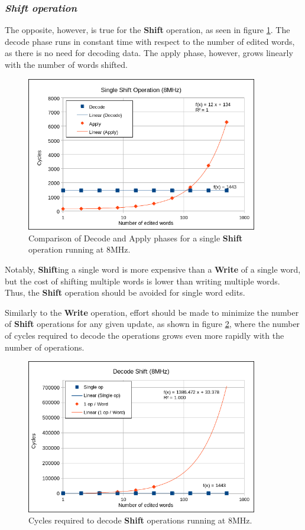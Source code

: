 \subsubsection*{\textbf{\textit{Shift operation}}}
The opposite, however, is true for the \textbf{Shift} operation, as seen in figure \ref{fig:sDecodeVsApply}. The decode phase runs in constant time with respect to the number of edited words, as there is no need for decoding data. The apply phase, however, grows linearly with the number of words shifted.
\begin{figure}[!ht]
    \centering
    \includegraphics[width=0.9\textwidth]{img/SDecodeVsApply.png}
    \caption{Comparison of Decode and Apply phases for a single \textbf{Shift} operation running at 8MHz.}
    \label{fig:sDecodeVsApply}
\end{figure}

Notably, \textbf{Shift}ing a single word is more expensive than a \textbf{Write} of a single word, but the cost of shifting multiple words is lower than writing multiple words. Thus, the \textbf{Shift} operation should be avoided for single word edits. 

Similarly to the \textbf{Write} operation, effort should be made to minimize the number of \textbf{Shift} operations for any given update, as shown in figure \ref{fig:sDecode8}, where the number of cycles required to decode the operations grows even more rapidly with the number of operations.
\begin{figure}[!ht]
    \centering
    \includegraphics[width=0.9\textwidth]{img/SDecode8.png}
    \caption{Cycles required to decode \textbf{Shift} operations running at 8MHz.}
    \label{fig:sDecode8}
\end{figure}

